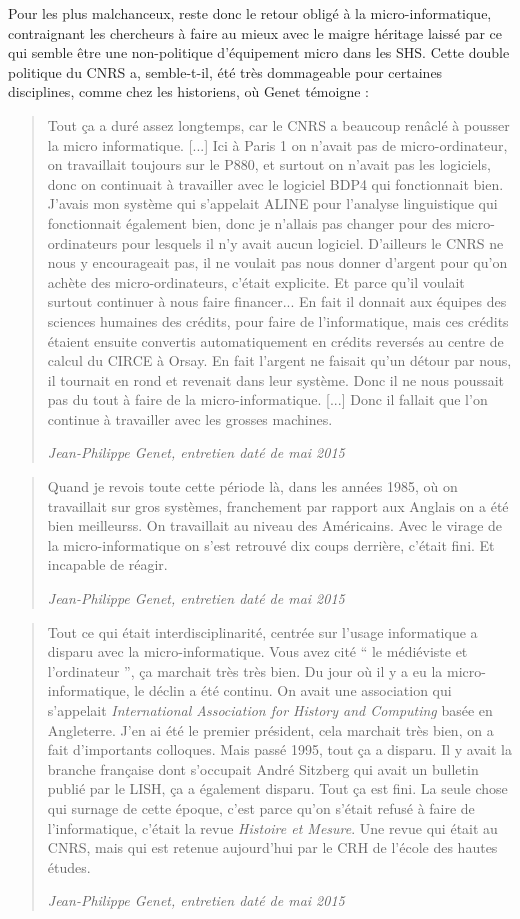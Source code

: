 Pour les plus malchanceux, reste donc le retour obligé à la micro-informatique, contraignant les chercheurs à faire au mieux avec le maigre héritage laissé par ce qui semble être une non-politique d'équipement micro dans les SHS. Cette double politique du CNRS a, semble-t-il, été très dommageable pour certaines disciplines, comme chez les historiens, où Genet témoigne :

\blockquote[\textit{Jean-Philippe Genet, entretien daté de mai 2015}]{Tout ça a duré assez longtemps, car le CNRS a beaucoup renâclé à pousser la micro informatique. [...] Ici à Paris 1 on n’avait pas de micro-ordinateur, on travaillait toujours sur le P880, et surtout on n’avait pas les logiciels, donc on continuait à travailler avec le logiciel BDP4 qui fonctionnait bien. J'avais mon système qui s'appelait ALINE pour l'analyse linguistique qui fonctionnait également bien, donc je n'allais pas changer pour des micro-ordinateurs pour lesquels il n'y avait aucun logiciel. D'ailleurs le CNRS ne nous y encourageait pas, il ne voulait pas nous donner d'argent pour qu'on achète des micro-ordinateurs, c'était explicite. Et parce qu'il voulait surtout continuer à nous faire financer... En fait il donnait aux équipes des sciences humaines des crédits, pour faire de l'informatique, mais ces crédits étaient ensuite convertis automatiquement en crédits reversés au centre de calcul du CIRCE à Orsay. En fait l'argent ne faisait qu'un détour par nous, il tournait en rond et revenait dans leur système. Donc il ne nous poussait pas du tout à faire de la micro-informatique. [...] Donc il fallait que l'on continue à travailler avec les grosses machines.}

\blockquote[\textit{Jean-Philippe Genet, entretien daté de mai 2015}]{Quand je revois toute cette période là, dans les années 1985, où on travaillait sur gros systèmes, franchement par rapport aux Anglais on a été bien meilleurss. On travaillait au niveau des Américains. Avec le virage de la micro-informatique on s'est retrouvé dix coups derrière, c'était fini. Et incapable de réagir.}

\blockquote[\textit{Jean-Philippe Genet, entretien daté de mai 2015}]{Tout ce qui était interdisciplinarité, centrée sur l'usage informatique a disparu avec la micro-informatique. Vous avez cité \enquote{ le médiéviste et l'ordinateur }, ça marchait très très bien. Du jour où il y a eu la micro-informatique, le déclin a été continu. On avait une association qui s'appelait \textit{International Association for History and Computing} basée en Angleterre. J'en ai été le premier président, cela marchait très bien, on a fait d'importants colloques. Mais passé 1995, tout ça a disparu. Il y avait la branche française dont s'occupait André Sitzberg qui avait un bulletin publié par le LISH, ça a également disparu. Tout ça est fini. La seule chose qui surnage de cette époque, c'est parce qu'on s'était refusé à faire de l'informatique, c'était la revue \textit{Histoire et Mesure}. Une revue qui était au CNRS, mais qui est retenue aujourd'hui par le CRH de l'école des hautes études.}

